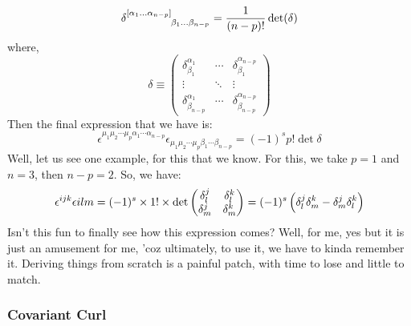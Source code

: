 $$\tensor{\delta}{^{[\alpha_1\ldots\alpha_{n-p}]} _{\beta_1\ldots\beta_{n-p}}} = \frac{1}{(n-p)!}\det(\mathrm{\delta})$$
where, $$\delta \equiv 
\begin{pmatrix}
\delta^{\alpha_1}_{\beta_1} & \cdots & \delta^{\alpha_{n-p}}_{\beta_1} \\
\vdots & \ddots & \vdots \\
\delta^{\alpha_1}_{\beta_{n-p}} & \cdots & \delta^{\alpha_{n-p}}_{\beta_{n-p}}
\end{pmatrix}$$
Then the final expression that we have is: 
$$\epsilon^{\mu_1 \mu_2 \cdots \mu_p \alpha_1 \cdots \alpha_{n-p}} 
\epsilon_{\mu_1 \mu_2 \cdots \mu_p \beta_1 \cdots \beta_{n-p}} 
= (-1)^s p! \det{\delta}$$
Well, let us see one example, for this that we know. For this, we take $p=1$ and $n=3$, then $n-p = 2$. So, we have:
$$\epsilon^{ijk}\epsilon{ilm} = (-1)^s \times 1! \times \det\begin{pmatrix}
    \delta^j_l &  \delta^k_l \\
     \delta^j_m &  \delta^k_m
\end{pmatrix} = (-1)^s \left( \delta^j_l \delta^k_m - \delta^j_m \delta^k_l \right)$$
Isn't this fun to finally see how this expression comes? Well, for me, yes but it is just an amusement for me, 'coz ultimately, to use it, we have to kinda remember it. Deriving things from scratch is a painful patch, with time to lose and little to match. 
\subsubsection{Covariant Curl}



